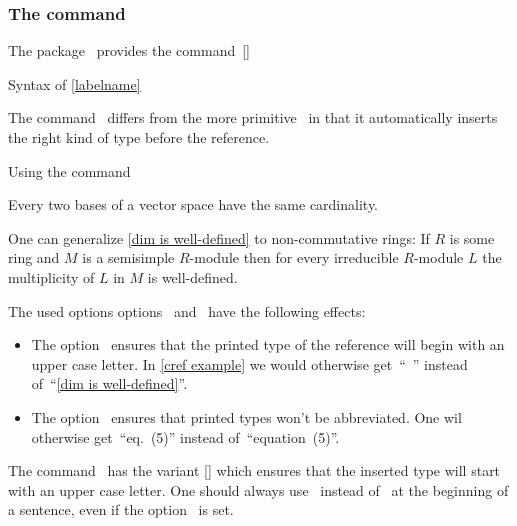 \subsubsection{The command~}

The package~ provides the command~[\comname]
\begin{showcode}{Syntax of }
\cref{labelname}
\end{showcode}
The command~ differs from the more primitive~ in that it automatically inserts the right kind of type before the reference.
\begin{showlatex}{Using the command~}
\begin{lemma}
  \label{dim is well-defined}
  Every two bases of a vector space have the same cardinality.
\end{lemma}

\begin{remark}
  One can generalize \cref{dim is well-defined} to non-commutative rings:
  If $R$ is some ring and $M$ is a semisimple $R$-module then for every irreducible $R$-module $L$ the multiplicity of $L$ in $M$ is well-defined.
\end{remark}
\end{showlatex}

The used options options~ and~ have the following effects:
\begin{itemize}
  \item
    The option~ ensures that the printed type of the reference will begin with an upper case letter.
    In \cref{cref example} we would otherwise get~\enquote{~} instead of~\enquote{\cref{dim is well-defined}}.
  \item
    The option~ ensures that printed types won’t be abbreviated.
    One wil otherwise get~\enquote{eq.\ (5)} instead of~\enquote{equation~(5)}.
\end{itemize}

The command~ has the variant [\comname] which ensures that the inserted type will start with an upper case letter.
One should always use~ instead of~ at the beginning of a sentence, even if the option~ is set.

